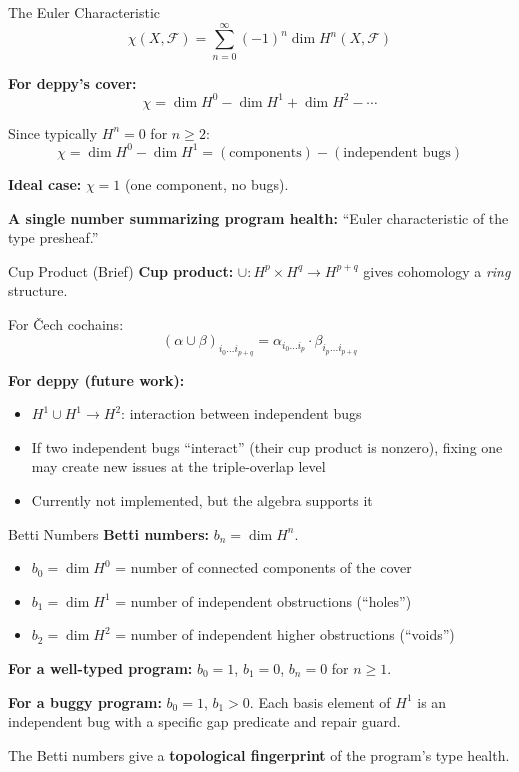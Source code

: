 \documentclass[aspectratio=169,10pt]{beamer}
\newcommand{\Fscr}{\mathcal{F}}
\begin{document}
\begin{frame}{The Euler Characteristic}
\[
\chi(X, \Fscr) = \sum_{n=0}^{\infty} (-1)^n \dim H^n(X, \Fscr)
\]

\textbf{For deppy's cover:}
\[
\chi = \dim H^0 - \dim H^1 + \dim H^2 - \cdots
\]

Since typically $H^n = 0$ for $n \geq 2$:
\[
\chi = \dim H^0 - \dim H^1 = (\text{components}) - (\text{independent bugs})
\]

\vspace{0.3em}
\textbf{Ideal case:} $\chi = 1$ (one component, no bugs).

\textbf{A single number summarizing program health:} ``Euler characteristic of the type presheaf.''
\end{frame}

\begin{frame}{Cup Product (Brief)}
\textbf{Cup product:} $\cup : H^p \times H^q \to H^{p+q}$ gives cohomology a \emph{ring} structure.

For \v{C}ech cochains:
\[
(\alpha \cup \beta)_{i_0 \ldots i_{p+q}} = \alpha_{i_0 \ldots i_p} \cdot \beta_{i_p \ldots i_{p+q}}
\]

\textbf{For deppy (future work):}
\begin{itemize}
  \item $H^1 \cup H^1 \to H^2$: interaction between independent bugs
  \item If two independent bugs ``interact'' (their cup product is nonzero), fixing one may create new issues at the triple-overlap level
  \item Currently not implemented, but the algebra supports it
\end{itemize}
\end{frame}

\begin{frame}{Betti Numbers}
\textbf{Betti numbers:} $b_n = \dim H^n$.

\begin{itemize}
  \item $b_0 = \dim H^0$ = number of connected components of the cover
  \item $b_1 = \dim H^1$ = number of independent obstructions (``holes'')
  \item $b_2 = \dim H^2$ = number of independent higher obstructions (``voids'')
\end{itemize}

\textbf{For a well-typed program:} $b_0 = 1$, $b_1 = 0$, $b_n = 0$ for $n \geq 1$.

\textbf{For a buggy program:} $b_0 = 1$, $b_1 > 0$. Each basis element of $H^1$ is an independent bug with a specific gap predicate and repair guard.

\vspace{0.3em}
The Betti numbers give a \textbf{topological fingerprint} of the program's type health.
\end{frame}
\end{document}
